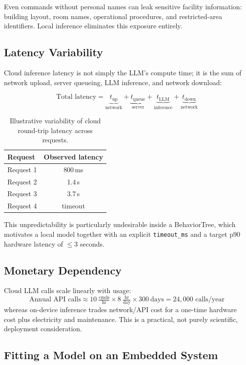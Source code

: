 \documentclass[11pt,a4paper]{article}
\begin{document}
Even commands without personal names can leak sensitive facility information:
building layout, room names, operational procedures, and restricted-area
identifiers. Local inference eliminates this exposure entirely.

\subsection{Latency Variability}

Cloud inference latency is not simply the LLM's compute time; it is the sum of
network upload, server queueing, LLM inference, and network download:

\[
\text{Total latency} = \underbrace{t_{\text{up}}}_{\text{network}} + \underbrace{t_{\text{queue}}}_{\text{server}} + \underbrace{t_{\text{LLM}}}_{\text{inference}} + \underbrace{t_{\text{down}}}_{\text{network}}
\]

\begin{table}[h]
\centering
\begin{tabular}{lc}
\toprule
\textbf{Request} & \textbf{Observed latency} \\
\midrule
Request 1 & 800\,ms \\
Request 2 & 1.4\,s \\
Request 3 & 3.7\,s \\
Request 4 & timeout \\
\bottomrule
\end{tabular}
\caption{Illustrative variability of cloud round-trip latency across requests.}
\end{table}

This unpredictability is particularly undesirable inside a BehaviorTree, which
motivates a local model together with an explicit \texttt{timeout\_ms} and a
target p90 hardware latency of $\leq 3$ seconds.

\subsection{Monetary Dependency}

Cloud LLM calls scale linearly with usage:
\[
\text{Annual API calls} \approx 10\ \tfrac{\text{cmds}}{\text{hr}} \times 8\ \tfrac{\text{hr}}{\text{day}} \times 300\ \text{days} = 24{,}000 \text{ calls/year}
\]
whereas on-device inference trades network/API cost for a one-time hardware
cost plus electricity and maintenance. This is a practical, not purely
scientific, deployment consideration.

\subsection{Fitting a Model on an Embedded System}
\end{document}
